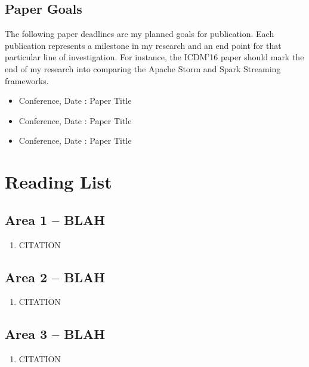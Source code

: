 \documentclass[oneside]{memoir}
\begin{document}
\section{Paper Goals}

The following paper deadlines are my planned goals for publication.
Each publication represents a milestone in my research and an end point for that particular line of investigation.
For instance, the ICDM'16 paper should mark the end of my research into comparing the Apache Storm and Spark Streaming frameworks.

\begin{itemize}
\item Conference, Date : Paper Title
\item Conference, Date : Paper Title
\item Conference, Date : Paper Title
\end{itemize}

%
%

\newpage

\appendix
\chapter{Reading List}
\label{app:readinglist}

\section{Area 1 -- BLAH}

\begin{enumerate}
\item CITATION
\end{enumerate}


\section{Area 2 -- BLAH}

\begin{enumerate}
\item CITATION
\end{enumerate}


\section{Area 3 -- BLAH}

\begin{enumerate}
\item CITATION
\end{enumerate}

 

\end{document}
